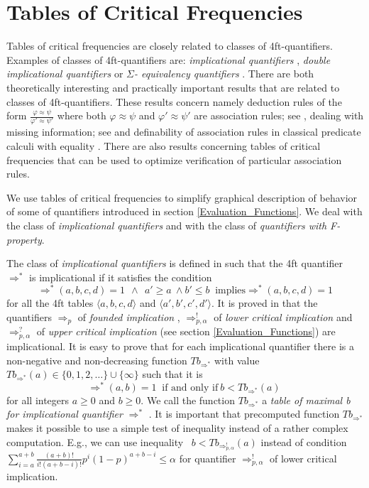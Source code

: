 \section{Tables of Critical Frequencies} \label{Classes_Tables}

Tables of critical frequencies are closely related to classes of 4ft-quantifiers.  
Examples of classes of 4ft-quantifiers are: {\em implicational quantifiers} \cite{Ha:78}, 
{\em double implicational quantifiers} \cite{Ra:05A}
or {\em $\Sigma$- equivalency quantifiers} \cite{Ra:05A}. 
There are both theoretically interesting and practically important results 
that are related to classes of 4ft-quantifiers. These results concern
namely deduction rules  of the form  $ \frac{\varphi \approx \psi}{\varphi' \approx \psi'} $
where both $ \varphi \approx \psi $ and 
$ \varphi' \approx \psi' $ are association rules; see \cite{Ra:05A}, dealing with missing information; 
see \cite{Ha:78,Ra:98A} and definability of association rules in classical predicate calculi 
with equality \cite{Ra:04}. There are also results concerning tables of critical frequencies that 
can be used to optimize verification of particular association rules. 

We use tables of critical frequencies to simplify graphical description 
of behavior of some of quantifiers introduced in section 
\ref{Evaluation_Functions}. We deal with the class of {\em implicational quantifiers}
and with the class of {\em quantifiers with F-property}.  

The class of {\em implicational quantifiers} is defined in \cite{Ha:78} such that 
the 4ft quantifier $ \Rightarrow^*  $ is implicational if it satisfies the condition 
%
$$ \Rightarrow^*(a,b,c,d) = 1   \ \ \land \ \ a' \geq a \  \land b' \leq b \ \mbox{ implies} \Rightarrow^*(a,b,c,d)  = 1 $$
%
for all the 4ft tables $ \langle a,b,c,d \rangle $   and $ \langle a',b',c',d'\rangle $.
It is proved in \cite{Ha:78}  that the quantifiers 
 $ \Rightarrow_{p} $ of {\it founded implication \/},  $ \Rightarrow^{!}_{p, \alpha} $ of
 {\it lower critical implication} and 
 $ \Rightarrow^{?}_{p, \alpha} $ of
 {\it upper critical implication} (see section 
 \ref{Evaluation_Functions}) are implicational. 
It is easy to prove that for each implicational quantifier there is a 
non-negative and non-decreasing function
$ Tb_{\Rightarrow^{*}}$ with value
\mbox{ $ Tb_{\Rightarrow^{*}}(a) \in  \{ 0,1,2, \dots \} \cup \{ \infty \}$}
such that it is 
$$ \Rightarrow^{*}(a,b) = 1  \ \mbox{ if and only if}  \ b <  Tb_{\Rightarrow^{*}}(a) \  $$
for all integers $ a \geq 0$ and $ b \geq 0 $.
We call the function $Tb_{\Rightarrow^{*}}$
a {\it table of maximal b for implicational quantifier \/} $\Rightarrow^{*}$ \cite{Ha:78,Ra:98A}.
It is important that precomputed function $Tb_{\Rightarrow^{*}}$
makes it possible to use a simple test of inequality
instead of a rather complex computation. E.g.,  we can use inequality
\mbox{ $ b < Tb_{\Rightarrow^{!}_{p, \alpha}}(a) $}
instead of condition \mbox{ $ \sum_{i = a}^{a + b} \frac{(a+b)!}{i!(a+b-i)!}
          p^{i} (1 - p)^{a+b-i} \leq \alpha $}
for quantifier
$ \Rightarrow^{!}_{p, \alpha} $ of lower critical implication. 

